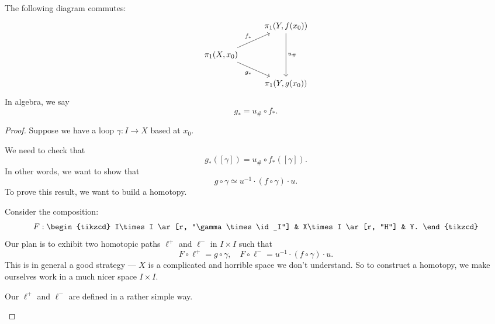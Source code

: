 \documentclass[a4paper]{article}
\begin{document}
\begin{lemma}
  The following diagram commutes:
  \[
    \begin{tikzcd}
      & \pi_1(Y, f(x_0)) \ar[dd, "u_\#"]\\
      \pi_1(X, x_0) \ar[ru, "f_*"] \ar [rd, "g_*"']& \\
      & \pi_1(Y, g(x_0))
    \end{tikzcd}
  \]
  In algebra, we say
  \[
    g_* = u_\# \circ f_*.
  \]
\end{lemma}

\begin{proof}
  Suppose we have a loop $\gamma: I\to X$ based at $x_0$.

  We need to check that
  \[
    g_*([\gamma]) = u_\#\circ f_*([\gamma]).
  \]
  In other words, we want to show that
  \[
    g\circ \gamma \simeq u^{-1}\cdot (f\circ \gamma)\cdot u.
  \]
  To prove this result, we want to build a homotopy.

  Consider the composition:
  \[
    F:
    \begin{tikzcd}
      I\times I \ar[r, "\gamma\times \id_I"] & X\times I \ar[r, "H"] & Y.
    \end{tikzcd}
  \]
  Our plan is to exhibit two homotopic paths $\ell^+$ and $\ell^-$ in $I\times I$ such that
  \[
    F\circ \ell^+ = g \circ \gamma,\quad F\circ \ell^- = u^{-1}\cdot (f\circ \gamma) \cdot u.
  \]
  This is in general a good strategy --- $X$ is a complicated and horrible space we don't understand. So to construct a homotopy, we make ourselves work in a much nicer space $I\times I$.

  Our $\ell^+$ and $\ell^-$ are defined in a rather simple way.
  \begin{center}
\end{center}
\end{proof}
\end{document}
